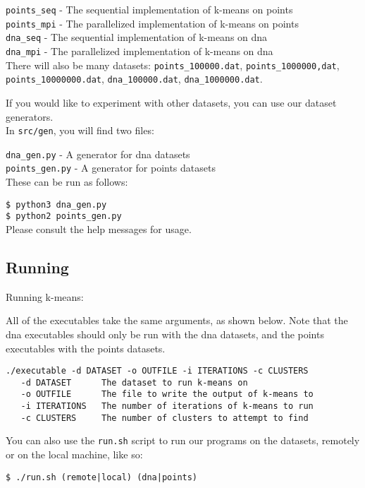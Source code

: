 \documentclass[12pt]{article}
\begin{document}
\texttt{points\_seq} - The sequential implementation of k-means on points \\
\texttt{points\_mpi} - The parallelized implementation of k-means on points \\
\texttt{dna\_seq} - The sequential implementation of k-means on dna \\
\texttt{dna\_mpi} - The parallelized implementation of k-means on dna \\

There will also be many datasets: \texttt{points\_100000.dat},
\texttt{points\_1000000,dat}, \texttt{points\_10000000.dat},
\texttt{dna\_100000.dat}, \texttt{dna\_1000000.dat}.

 If you would like to experiment with other datasets, you can use our dataset generators.\\


 In \texttt{src/gen}, you will find two files: 


 \texttt{dna\_gen.py} - A generator for dna datasets \\
 \texttt{points\_gen.py} - A generator for points datasets \\


 These can be run as follows:


 \texttt{\$ python3 dna\_gen.py} \\
 \texttt{\$ python2 points\_gen.py} \\

 Please consult the help messages for usage.

 \subsection{Running}

Running k-means:

All of the executables take the same arguments, as shown below. Note that the dna executables should only be run with the dna datasets, and the points executables with the points datasets.

\begin{verbatim}
./executable -d DATASET -o OUTFILE -i ITERATIONS -c CLUSTERS
   -d DATASET      The dataset to run k-means on
   -o OUTFILE      The file to write the output of k-means to
   -i ITERATIONS   The number of iterations of k-means to run
   -c CLUSTERS     The number of clusters to attempt to find
\end{verbatim}

You can also use the \texttt{run.sh} script to run our programs on the
datasets, remotely or on the local machine, like so:

\begin{verbatim}
$ ./run.sh (remote|local) (dna|points)
\end{verbatim}
\end{document}
